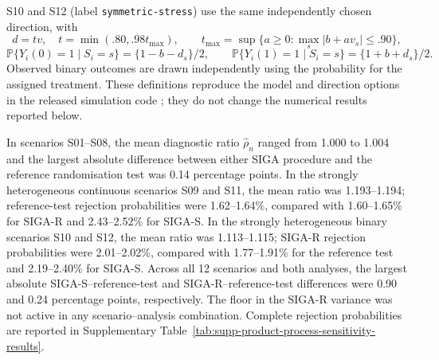 \documentclass[12pt,a4paper]{article}
\theoremstyle{definition}
\theoremstyle{remark}\newtheorem{remark}{Remark}
\numberwithin{equation}{section}
\newcommand{\Pbb}{\mathbb P}
\begin{document}
S10 and S12 (label \texttt{symmetric-stress}) use the same independently chosen direction, with
\[
 d=t v,\quad t=\min(.80,.98t_{\max}),\qquad
 t_{\max}=\sup\{a\ge0:\max_s|b+a v_s|\le.90\},
\]
\[
 \Pbb\{Y_i(0)=1\mid S_i=s\}=\{1-b-d_s\}/2,\qquad
 \Pbb\{Y_i(1)=1\mid S_i=s\}=\{1+b+d_s\}/2.
\]
Observed binary outcomes are drawn independently using the probability for the assigned treatment. These definitions reproduce the model and direction options in the released simulation code \citep{KojimaSIGA2026}; they do not change the numerical results reported below.

In scenarios S01--S08, the mean diagnostic ratio $\widehat\rho_n$ ranged from 1.000 to 1.004 and the largest absolute difference between either SIGA procedure and the reference randomisation test was 0.14 percentage points. In the strongly heterogeneous continuous scenarios S09 and S11, the mean ratio was 1.193--1.194; reference-test rejection probabilities were 1.62--1.64\%, compared with 1.60--1.65\% for SIGA-R and 2.43--2.52\% for SIGA-S. In the strongly heterogeneous binary scenarios S10 and S12, the mean ratio was 1.113--1.115; SIGA-R rejection probabilities were 2.01--2.02\%, compared with 1.77--1.91\% for the reference test and 2.19--2.40\% for SIGA-S. Across all 12 scenarios and both analyses, the largest absolute SIGA-S--reference-test and SIGA-R--reference-test differences were 0.90 and 0.24 percentage points, respectively. The floor in the SIGA-R variance was not active in any scenario--analysis combination. Complete rejection probabilities are reported in Supplementary Table~\ref{tab:supp-product-process-sensitivity-results}.

\clearpage
\begingroup
\small
\setlength{\tabcolsep}{3.95pt}
\renewcommand{\arraystretch}{1.06}
\setlength{\LTleft}{\fill}
\setlength{\LTright}{\fill}
\end{document}

